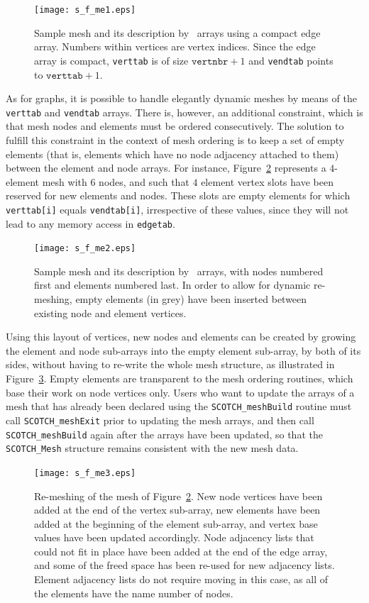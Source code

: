 \begin{figure}
\centering\texttt{[image: s\_f\_me1.eps]}
\caption{Sample mesh and its description by \libscotch\ arrays using a
compact edge array. Numbers within vertices are vertex indices. Since the
edge array is compact, {\tt verttab} is of size $\mathtt{vertnbr} +
1$ and {\tt vendtab} points to $\mathtt{verttab} + 1$.}
\label{fig-lib-mesh-one}
\end{figure}

As for graphs, it is possible to handle elegantly dynamic meshes by
means of the {\tt verttab} and {\tt vendtab} arrays. There is,
however, an additional constraint, which is that mesh nodes and
elements must be ordered consecutively. The solution to fulfill this
constraint in the context of mesh ordering is to keep a set of empty
elements (that is, elements which have no node adjacency attached to
them) between the element and node arrays. For instance,
Figure~\ref{fig-lib-mesh-two} represents a $4$-element mesh with $6$
nodes, and such that $4$ element vertex slots have been reserved for
new elements and nodes. These slots are empty elements for which
{\tt verttab[i]} equals {\tt vendtab[i]}, irrespective of these
values, since they will not lead to any memory access in {\tt edgetab}.

\begin{figure}
\centering\texttt{[image: s\_f\_me2.eps]}
\caption{Sample mesh and its description by \libscotch\ arrays, with
nodes numbered first and elements numbered last. In order to allow for
dynamic re-meshing, empty elements (in grey) have been inserted between
existing node and element vertices.}
\label{fig-lib-mesh-two}
\end{figure}

Using this layout of vertices, new nodes and elements can be created
by growing the element and node sub-arrays into the empty element
sub-array, by both of its sides, without having to re-write the whole
mesh structure, as illustrated in
Figure~\ref{fig-lib-mesh-three}. Empty elements are transparent to the
mesh ordering routines, which base their work on node vertices only.
Users who want to update the arrays of a mesh that has already
been declared using the {\tt SCOTCH\_\lbt mesh\lbo Build} routine must
call {\tt SCOTCH\_\lbt mesh\lbo Exit} prior to updating the mesh arrays,
and then call {\tt SCOTCH\_\lbt mesh\lbo Build} again after the arrays
have been updated, so that the {\tt SCOTCH\_\lbt Mesh} structure remains
consistent with the new mesh data.

\begin{figure}
\centering\texttt{[image: s\_f\_me3.eps]}
\caption{Re-meshing of the mesh of Figure~\protect\ref{fig-lib-mesh-two}.
New node vertices have been added at the end of the vertex sub-array,
new elements have been added at the beginning of the element sub-array,
and vertex base values have been updated accordingly. Node adjacency
lists that could not fit in place have been added at the end of the edge
array, and some of the freed space has been re-used for new adjacency
lists. Element adjacency lists do not require moving in this case, as
all of the elements have the name number of nodes.}
\label{fig-lib-mesh-three}
\end{figure}


